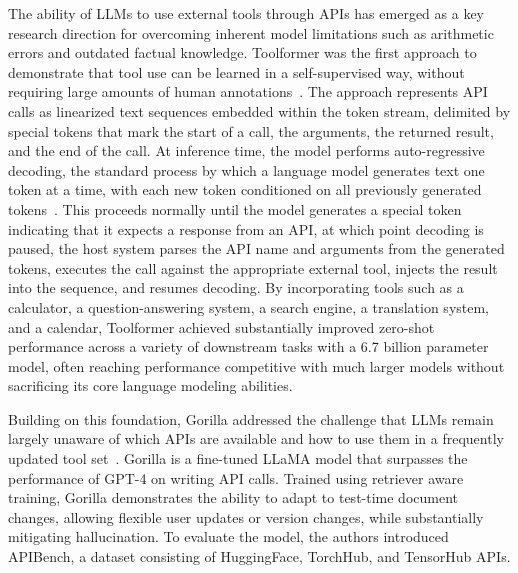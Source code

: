 \documentclass[
english,                 %
bibtex,                  %
includeExtraAbstracts, %
]{kththesis}
\numberwithin{listing}{chapter}
\begin{document}
The ability of \glspl{LLM} to use external tools through \glspl{API} has emerged as a key research direction for overcoming inherent model limitations such as arithmetic errors and outdated factual knowledge. Toolformer was the first approach to demonstrate that tool use can be learned in a self-supervised way, without requiring large amounts of human annotations~\cite{schick_toolformer_2023}. The approach represents \gls{API} calls as linearized text sequences embedded within the token stream, delimited by special tokens that mark the start of a call, the arguments, the returned result, and the end of the call. At inference time, the model performs auto-regressive decoding, the standard process by which a language model generates text one token at a time, with each new token conditioned on all previously generated tokens~\cite{zhong_extractive_2020}. This proceeds normally until the model generates a special token indicating that it expects a response from an \gls{API}, at which point decoding is paused, the host system parses the \gls{API} name and arguments from the generated tokens, executes the call against the appropriate external tool, injects the result into the sequence, and resumes decoding. By incorporating tools such as a calculator, a question-answering system, a search engine, a translation system, and a calendar, Toolformer achieved substantially improved zero-shot performance across a variety of downstream tasks with a 6.7 billion parameter model, often reaching performance competitive with much larger models without sacrificing its core language modeling abilities.

Building on this foundation, Gorilla addressed the challenge that \glspl{LLM} remain largely unaware of which \glspl{API} are available and how to use them in a frequently updated tool set~\cite{gonzalez_gorilla_2024}. Gorilla is a fine-tuned \gls{LLaMA} model that surpasses the performance of \gls{GPT}-4 on writing \gls{API} calls. Trained using retriever aware training, Gorilla demonstrates the ability to adapt to test-time document changes, allowing flexible user updates or version changes, while substantially mitigating hallucination. To evaluate the model, the authors introduced \gls{API}Bench, a dataset consisting of HuggingFace, TorchHub, and TensorHub \glspl{API}.
\end{document}

